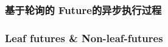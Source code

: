 % 
% 
% 
% 
% 
% 
\begin{frame}[fragile]
    \frametitle{基于轮询的 Future的异步执行过程}
\end{frame}
% 
% 
% 
\begin{frame}[fragile]
    \frametitle{Leaf futures \& Non-leaf-futures}
\end{frame}
% 
% 
% 
% 
